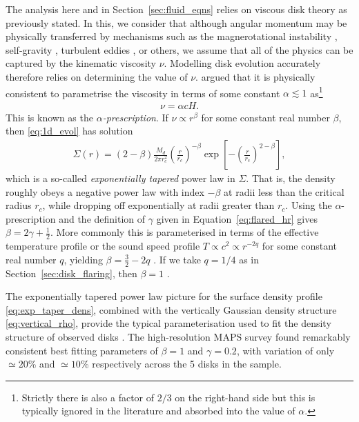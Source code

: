 The analysis here and in Section~\ref{sec:fluid_eqns} relies on viscous disk theory as previously stated.
In this, we consider that although angular momentum may be physically transferred by mechanisms such as the magnerotational instability \citep{sano2000}, self-gravity \citep{kratter2016}, turbulent eddies \citep{klahr2003}, or others, we assume that all of the physics can be captured by the kinematic viscosity $\nu$.
Modelling disk evolution accurately therefore relies on determining the value of $\nu$.
\citet{shakura1973} argued that it is physically consistent to parametrise the viscosity in terms of some constant $\alpha \lesssim 1$ as\footnote{Strictly there is also a factor of $2/3$ on the right-hand side but this is typically ignored in the literature and absorbed into the value of $\alpha$.}
\begin{align}
    \nu = \alpha c H.
\end{align}
This is known as the $\alpha$\textit{-prescription}. If $\nu \propto r^\beta$ for some constant real number $\beta$, then \eqref{eq:1d_evol} has solution \citep{lynden-bell1974}
\begin{align}
    \Sigma(r) = (2 - \beta) \frac{M_d}{2 \pi r_c^2} \left( \frac{r}{r_c} \right)^{-\beta} \exp{\left[ - \left(\frac{r}{r_c}\right)^{2-\beta} \right]}, \label{eq:exp_taper_dens}
\end{align}
which is a so-called \textit{exponentially tapered} power law in $\Sigma$.
That is, the density roughly obeys a negative power law with index $-\beta$ at radii less than the critical radius $r_c$, while dropping off exponentially at radii greater than $r_c$.
Using the $\alpha$-prescription and the definition of $\gamma$ given in Equation~\eqref{eq:flared_hr} gives $\beta=2\gamma+\frac{1}{2}$.
More commonly this is parameterised in terms of the effective temperature profile or the sound speed profile $T \propto c^2 \propto r^{-2q}$ for some constant real number $q$, yielding $\beta = \frac{3}{2} - 2q$ \citep{hartmann1998}.
If we take $q=1/4$ as in Section~\ref{sec:disk_flaring}, then $\beta=1$ \citep{chiang1997}.

The exponentially tapered power law picture for the surface density profile \eqref{eq:exp_taper_dens}, combined with the vertically Gaussian density structure \eqref{eq:vertical_rho}, provide the typical parameterisation used to fit the density structure of observed disks \citep{andrews2011,zhang2021}.
The high-resolution MAPS survey found remarkably consistent best fitting parameters of $\beta=1$ and $\gamma=0.2$, with variation of only $\simeq20$\% and $\simeq10$\% respectively across the 5 disks in the sample.

